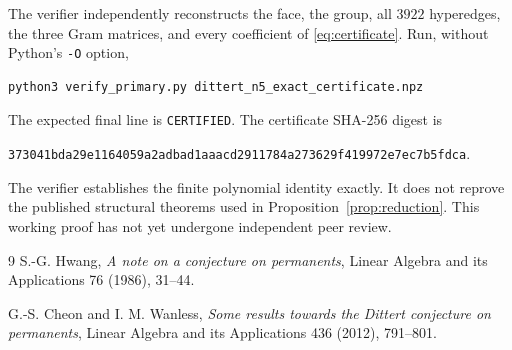 \documentclass[11pt]{article}
\begin{document}
The verifier independently reconstructs the face, the group, all $3922$
hyperedges, the three Gram matrices, and every coefficient of
\eqref{eq:certificate}.  Run, without Python's \texttt{-O} option,
\begin{verbatim}
python3 verify_primary.py dittert_n5_exact_certificate.npz
\end{verbatim}
The expected final line is \texttt{CERTIFIED}.  The certificate SHA-256 digest
is
\begin{center}
\texttt{373041bda29e1164059a2adbad1aaacd2911784a273629f419972e7ec7b5fdca}.
\end{center}

The verifier establishes the finite polynomial identity exactly.  It does not
reprove the published structural theorems used in
Proposition~\ref{prop:reduction}.  This working proof has not yet undergone
independent peer review.

\begin{thebibliography}{9}
S.-G. Hwang,
\emph{A note on a conjecture on permanents},
Linear Algebra and its Applications 76 (1986), 31--44.

G.-S. Cheon and I. M. Wanless,
\emph{Some results towards the Dittert conjecture on permanents},
Linear Algebra and its Applications 436 (2012), 791--801.
\end{thebibliography}
\end{document}
